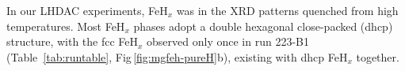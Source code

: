 \documentclass[draft,jgrga,12pt]{agujournal2019}
\begin{document}


In our LHDAC experiments, FeH$_x$ was {} in the XRD patterns quenched from high temperatures.
Most FeH$_x$ phases adopt a double hexagonal close-packed (dhcp) structure, with the fcc FeH$_x$ observed only once in run 223-B1 (Table~\ref{tab:runtable}, Fig\,\ref{fig:mgfeh-pureH}b), existing with dhcp FeH$_x$ together. 




\end{document}
